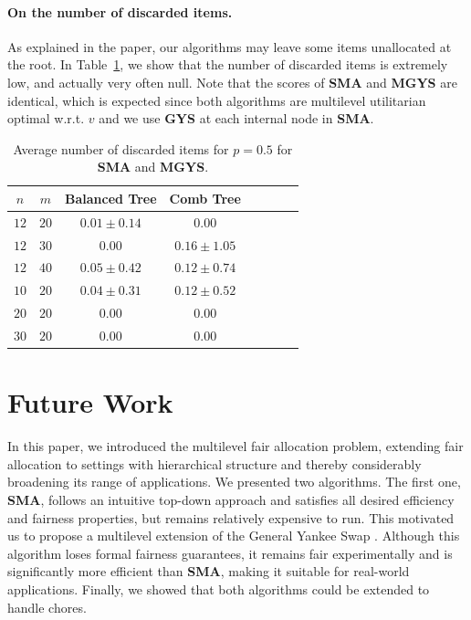 \documentclass[]{article}
\begin{document}
\paragraph{On the number of discarded items.} As explained in the paper, our algorithms may leave some items unallocated at the root. In Table~\ref{tab: discarded items}, we show that the number of discarded items is extremely low, and actually very often null. Note that the scores of \textbf{SMA} and \textbf{MGYS} are identical, which is expected since both algorithms are multilevel utilitarian optimal w.r.t. $v$ and we use \textbf{GYS} at each internal node in \textbf{SMA}.

\begin{table}[h!] \small
\centering
\caption{Average number of discarded items for $p=0.5$ for \textbf{SMA} and \textbf{MGYS}.}
\begin{tabular}{|c|c|c|c|c|c|c|c|}
  \hline
  $n$ & $m$ & Balanced Tree & Comb Tree  \\
  \hline
  $12$ & $20$  & $0.01 \pm 0.14$ & $0.00$ \\
  $12$ & $30$  & $0.00$ & $0.16 \pm 1.05$ \\
  $12$ & $40$  & $0.05 \pm 0.42$ & $0.12 \pm 0.74$ \\
  \hline
  $10$ & $20$  & $0.04 \pm 0.31$ & $0.12 \pm 0.52$ \\
  $20$ & $20$  & $0.00$ & $0.00$ \\
  $30$ & $20$  & $0.00$ & $0.00$ \\
  \hline
\end{tabular}
\label{tab: discarded items}
\end{table}


\section{Future Work}

In this paper, we introduced the multilevel fair allocation problem, extending fair allocation to settings with hierarchical structure and thereby considerably broadening its range of applications. We presented two algorithms. The first one, \textbf{SMA}, follows an intuitive top-down approach and satisfies all desired efficiency and fairness properties, but remains relatively expensive to run. This motivated us to propose a multilevel extension of the General Yankee Swap \cite{Viswanathan_Zick2023b}. Although this algorithm loses formal fairness guarantees, it remains fair experimentally and is significantly more efficient than \textbf{SMA}, making it suitable for real-world applications. Finally, we showed that both algorithms could be extended to handle chores.
\end{document}

